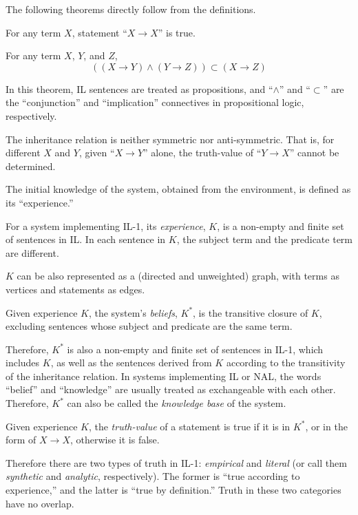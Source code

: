 The following theorems directly follow from the definitions.

\begin{theo}
For any term $X$, statement ``\(X \rightarrow X\)'' is true.
\end{theo}

\begin{theo}
For any term $X$, $Y$, and $Z$,
\[((X \rightarrow Y) \wedge (Y \rightarrow Z)) \subset (X \rightarrow Z)\]
\end{theo}
In this theorem, IL sentences are treated as propositions, and ``$\wedge$'' and ``$\subset$'' are the ``conjunction'' and ``implication'' connectives in propositional logic, respectively.

The inheritance relation is neither symmetric nor anti-symmetric.  That is, for different $X$ and $Y$, given ``\(X \rightarrow Y\)'' alone, the truth-value of ``\(Y \rightarrow X\)'' cannot be determined.

The initial knowledge of the system, obtained from the environment, is defined as its ``experience.''
\begin{defi}
For a system implementing IL-1, its {\em experience}, $K$, is a non-empty and finite set of sentences in IL. In each sentence in $K$, the subject term and the predicate term are different.
\end{defi}
$K$ can be also represented as a (directed and unweighted) graph, with terms as vertices and statements as edges.

\begin{defi}
Given experience $K$, the system's {\em beliefs}, $K^*$, is the transitive closure of $K$, excluding sentences whose subject and predicate are the same term.
\end{defi}
Therefore, $K^*$ is also a non-empty and finite set of sentences in IL-1, which includes $K$, as well as the sentences derived from $K$ according to the transitivity of the inheritance relation. In systems implementing IL or NAL, the words ``belief'' and ``knowledge'' are usually treated as exchangeable with each other. Therefore, $K^*$ can also be called the \emph{knowledge base} of the system.

\begin{defi}
Given experience $K$, the \emph{truth-value} of a statement is true if it is in $K^*$, or in the form of \(X \rightarrow X\), otherwise it is false.
\end{defi}

Therefore there are two types of truth in IL-1: {\em empirical} and {\em literal} (or call them \emph{synthetic} and \emph{analytic}, respectively).  The former is ``true according to experience,'' and the latter is ``true by definition.'' Truth in these two categories have no overlap.  


